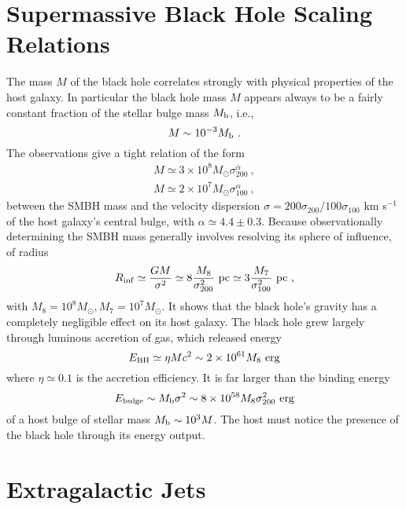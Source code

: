 \documentclass[12pt,a4paper]{article}
\begin{document}
\section{Supermassive Black Hole Scaling Relations}
\cite{2015ARA&A..53..115K}  The mass $M$ of the black hole correlates strongly with physical properties of the host galaxy. In particular the black hole mass $M$ appears always to be a fairly constant fraction of the stellar bulge mass $M_{\rm b}$, i.e.,
\begin{equation}
M \sim 10^{-3} M_{\rm b} ~.
\end{equation}
The observations give a tight relation of the form
\begin{align}
M \simeq 3\times 10^8 M_\odot \sigma_{200}^\alpha ~, \\
M \simeq 2\times 10^7 M_\odot \sigma_{100}^\alpha ~,
\end{align}
between the SMBH mass and the velocity dispersion $\sigma = 200 \sigma_{200}/100 \sigma_{100}$ km s$^{-1}$ of the host galaxy's central bulge, with $\alpha \simeq 4.4 \pm 0.3$. Because observationally determining the SMBH mass generally involves resolving its sphere of influence, of radius
\begin{equation}
R_{\rm inf} \simeq \frac{GM}{\sigma^2} \simeq 8 \frac{M_8}{\sigma^2_{200} } ~{\rm pc} \simeq 3 \frac{M_7}{\sigma^2_{100} } ~{\rm pc} ~,
\end{equation}
with $M_8 = 10^8 M_\odot, M_7 = 10^7 M_\odot$. It shows that the black hole's gravity has a completely negligible effect on its host galaxy. The black hole grew largely through luminous accretion of gas, which released energy
\begin{equation}
E_{\rm BH} \simeq \eta M c^2 \sim 2\times 10^{61} M_8~ {\rm erg}
\end{equation}
where $\eta \simeq 0.1$ is the accretion efficiency. It is far larger than the binding energy
\begin{equation}
E_{\rm bulge} \sim M_{\rm b} \sigma^2 \sim 8\times 10^{58} M_8 \sigma_{200}^2 ~{\rm erg}
\end{equation}
of a host bulge of stellar mass $M_{\rm b} \sim 10^3 M$. The host must notice the presence of the black hole through its energy output.

\section{Extragalactic Jets}
\end{document}
